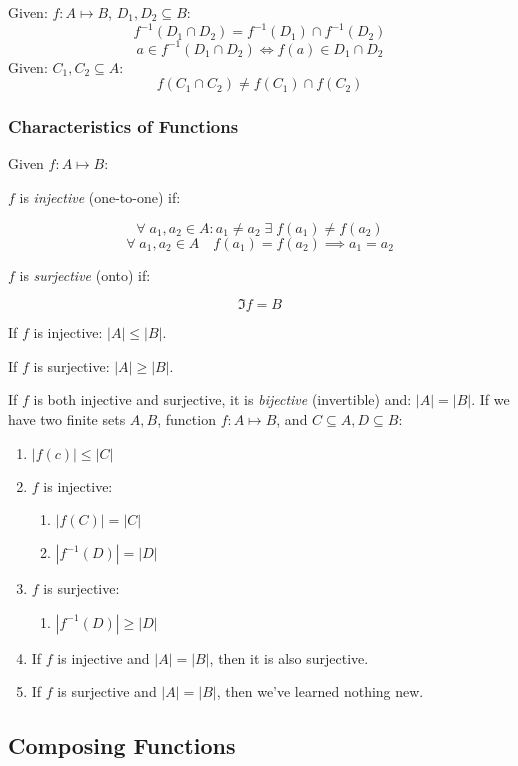 \documentclass[00_complete]{subfiles}
\begin{document}
\begin{claim}
Given: $f: A \mapsto B$, $D_1, D_2 \subseteq B$:
$$f^{-1}(D_1 \cap D_2) = f^{-1}(D_1) \cap f^{-1}(D_2)$$
$$a \in f^{-1}(D_1 \cap D_2) \iff f(a) \in D_1 \cap D_2$$
Given: $C_1, C_2 \subseteq A$:
$$f(C_1 \cap C_2) \neq f(C_1) \cap f(C_2)$$
\end{claim}

\subsubsection{Characteristics of Functions}
Given $f: A \mapsto B$:

$f$ is \emph{injective} (one-to-one) if:

$$\forall \; a_1,a_2 \in A : a_1 \neq a_2 \; \exists \; f(a_1) \neq f(a_2)$$
$$\forall \; a_1,a_2 \in A \quad f(a_1) = f(a_2) \implies a_1 = a_2$$

$f$ is \emph{surjective} (onto) if:

$$\Im f = B$$

If $f$ is injective: $|A| \leq |B|$.

If $f$ is surjective: $|A| \geq |B|$.

If $f$ is both injective and surjective, it is \emph{bijective} (invertible) and: $|A| = |B|$.
If we have two finite sets $A, B$, function $f: A \mapsto B$, and $C
\subseteq A, D \subseteq B$:
\begin{enumerate}
    \item $|f(c)| \leq |C|$
    \item $f$ is injective:
     \begin{enumerate}
        \item $|f(C)|= |C|$
        \item $|f^{-1}(D)| = |D|$
     \end{enumerate}
    \item $f$ is surjective:
    \begin{enumerate}
        \item $|f^{-1}(D)| \geq |D|$
    \end{enumerate}
    \item If $f$ is injective and $|A|=|B|$, then it is also surjective.
    \item If $f$ is surjective and $|A|=|B|$, then we've learned nothing new.
\end{enumerate}

\subsection{Composing Functions}
\end{document}

